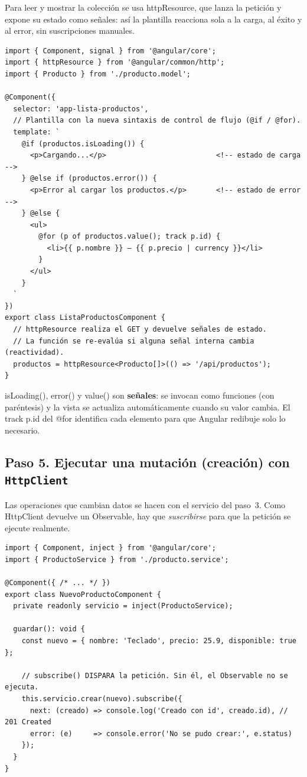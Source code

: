 \documentclass[11pt,a4paper]{article}
\newcommand{\code}[1]{{\ttfamily\color{ngdark}#1}}
\begin{document}
Para leer y mostrar la colección se usa \code{httpResource}, que lanza la petición y expone su estado como señales: así la plantilla reacciona sola a la carga, al éxito y al error, sin suscripciones manuales.

\begin{lstlisting}[caption={\texttt{src/app/lista-productos.component.ts} --- lectura reactiva con señales.},label={lst:lista}]
import { Component, signal } from '@angular/core';
import { httpResource } from '@angular/common/http';
import { Producto } from './producto.model';

@Component({
  selector: 'app-lista-productos',
  // Plantilla con la nueva sintaxis de control de flujo (@if / @for).
  template: `
    @if (productos.isLoading()) {
      <p>Cargando...</p>                          <!-- estado de carga -->
    } @else if (productos.error()) {
      <p>Error al cargar los productos.</p>       <!-- estado de error -->
    } @else {
      <ul>
        @for (p of productos.value(); track p.id) {
          <li>{{ p.nombre }} — {{ p.precio | currency }}</li>
        }
      </ul>
    }
  `
})
export class ListaProductosComponent {
  // httpResource realiza el GET y devuelve señales de estado.
  // La función se re-evalúa si alguna señal interna cambia (reactividad).
  productos = httpResource<Producto[]>(() => '/api/productos');
}
\end{lstlisting}

\begin{nota}
	\code{isLoading()}, \code{error()} y \code{value()} son \textbf{señales}: se invocan como funciones (con paréntesis) y la vista se actualiza automáticamente cuando su valor cambia. El \code{track p.id} del \code{@for} identifica cada elemento para que Angular redibuje solo lo necesario.
\end{nota}

\subsection*{Paso 5. Ejecutar una mutación (creación) con \texttt{HttpClient}}

Las operaciones que cambian datos se hacen con el servicio del paso~3. Como \code{HttpClient} devuelve un \code{Observable}, hay que \emph{suscribirse} para que la petición se ejecute realmente.

\begin{lstlisting}[caption={Fragmento de componente --- crear un producto.},label={lst:crear}]
import { Component, inject } from '@angular/core';
import { ProductoService } from './producto.service';

@Component({ /* ... */ })
export class NuevoProductoComponent {
  private readonly servicio = inject(ProductoService);

  guardar(): void {
    const nuevo = { nombre: 'Teclado', precio: 25.9, disponible: true };

    // subscribe() DISPARA la petición. Sin él, el Observable no se ejecuta.
    this.servicio.crear(nuevo).subscribe({
      next: (creado) => console.log('Creado con id', creado.id), // 201 Created
      error: (e)     => console.error('No se pudo crear:', e.status)
    });
  }
}
\end{lstlisting}
\end{document}
